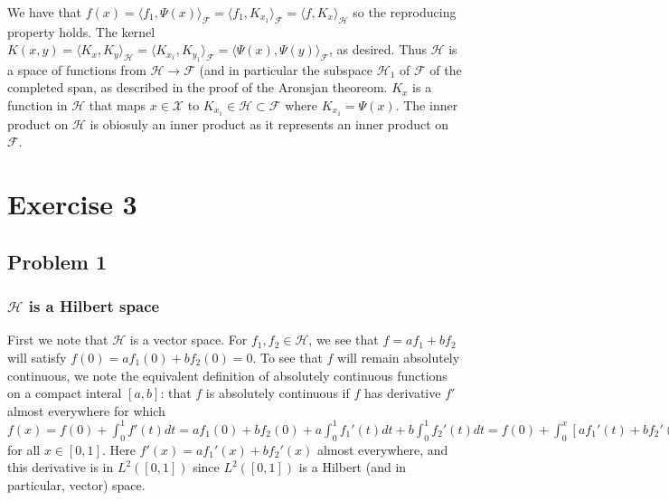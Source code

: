 \documentclass[12pt]{article}
\begin{document}
	We have that $f(x) = \langle f_1, \Psi(x) \rangle_\mathcal{F} = \langle f_1, K_{x_1} \rangle_\mathcal{F} = \langle f, K_x\rangle_\mathcal{H}$ so the reproducing property holds. The kernel $K(x,y) = \langle K_x, K_y \rangle_\mathcal{H} = \langle K_{x_1}, K_{y_1} \rangle_\mathcal{F} = \langle \Psi(x), \Psi(y) \rangle_\mathcal{F}$, as desired. Thus $\mathcal{H}$ is a space of functions from $\mathcal{H} \rightarrow \mathcal{F}$ (and in particular the subspace $\mathcal{H}_1$ of $\mathcal{F}$ of the completed span, as described in the proof of the Aronsjan theoreom. $K_x$ is a function in $\mathcal{H}$ that maps $x \in \mathcal{X}$ to $K_{x_1} \in \mathcal{H} \subset \mathcal{F}$ where $K_{x_1} = \Psi(x)$. The inner product on $\mathcal{H}$ is obiosuly an inner product as it represents an inner product on $\mathcal{F}$.
	

	

\section{Exercise 3}
\subsection{Problem 1}  
\subsubsection{$\mathcal{H}$ is a Hilbert space} First we note that $\mathcal{H}$ is a vector space. For $f_1, f_2 \in \mathcal{H}$, we see that $f = af_1 + bf_2$ will satisfy $f(0) = af_1(0)+bf_2(0) = 0$. To see that $f$ will remain absolutely continuous, we note the equivalent definition of absolutely continuous functions on a compact interal $[a,b]$: that $f$ is absolutely continuous if $f$ has derivative $f'$ almost everywhere for which $f(x) = f(0) + \int_0^1 f'(t) dt = af_1(0)+bf_2(0) + a \int_0^1 f_1'(t) dt + b \int_0^1 f_2'(t) dt = f(0) + \int_0^x [af_1'(t) + bf_2'(t)] dt$ for all $x \in [0,1]$. Here $f'(x) = af_1'(x) + bf_2'(x)$ almost everywhere, and this derivative is in $L^2([0,1])$ since $L^2([0,1])$ is a Hilbert (and in particular, vector) space.
\end{document}
